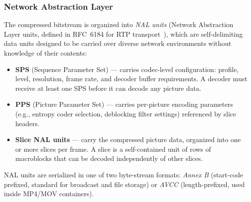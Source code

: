\subsubsection{Network Abstraction Layer}
The compressed bitstream is organized into \textit{NAL units} (Network Abstraction Layer units, defined in RFC~6184 for \ac{RTP} transport~\cite{jesup_rtp_2011}), which are self-delimiting data units designed to be carried over diverse network environments without knowledge of their contents:
\begin{itemize}
    \item \textbf{SPS} (Sequence Parameter Set) --- carries codec-level configuration: profile, level, resolution, frame rate, and decoder buffer requirements. A decoder must receive at least one SPS before it can decode any picture data.~\cite{jesup_rtp_2011}
    \item \textbf{PPS} (Picture Parameter Set) --- carries per-picture encoding parameters (e.g., entropy coder selection, deblocking filter settings) referenced by slice headers.~\cite{jesup_rtp_2011}
    \item \textbf{Slice NAL units} --- carry the compressed picture data, organized into one or more slices per frame. A slice is a self-contained unit of rows of macroblocks that can be decoded independently of other slices.~\cite{jesup_rtp_2011}
\end{itemize}
NAL units are serialized in one of two byte-stream formats: \textit{Annex B} (start-code prefixed, standard for broadcast and file storage) or \textit{AVCC} (length-prefixed, used inside MP4/MOV containers).~\cite{jesup_rtp_2011}


